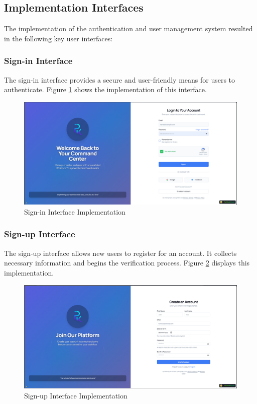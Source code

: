 \subsection{Implementation Interfaces}
The implementation of the authentication and user management system resulted in the following key user interfaces:

\subsubsection{Sign-in Interface}
The sign-in interface provides a secure and user-friendly means for users to authenticate. Figure \ref{fig:signin-interface} shows the implementation of this interface.
\newpage
\begin{figure}[htbp]
    \centering
    \includegraphics[width=1\textwidth]{images/signin-interface.png}
    \caption{Sign-in Interface Implementation}
    \label{fig:signin-interface}
\end{figure}

\subsubsection{Sign-up Interface}
The sign-up interface allows new users to register for an account. It collects necessary information and begins the verification process. Figure \ref{fig:signup-interface} displays this implementation.

\begin{figure}[htbp]
    \centering
    \includegraphics[width=1\textwidth]{images/signup-interface.png}
    \caption{Sign-up Interface Implementation}
    \label{fig:signup-interface}
\end{figure}

